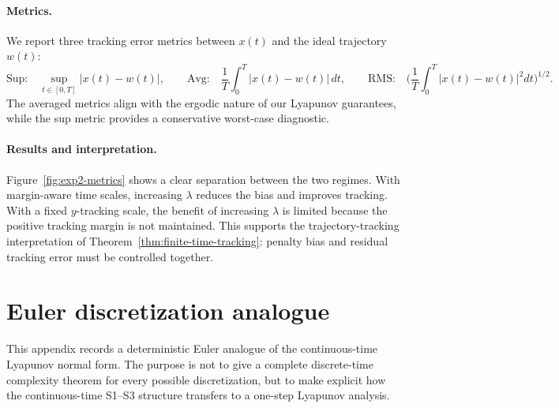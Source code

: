 \documentclass{article}
\newcommand{\1}{\mathbf{1}}
\begin{document}
\paragraph{Metrics.}
We report three tracking error metrics between $x(t)$ and the ideal trajectory $w(t)$:
\[
\text{Sup:}\quad \sup_{t\in[0,T]}|x(t)-w(t)|,
\qquad
\text{Avg:}\quad \frac1T\int_0^T|x(t)-w(t)|\,dt,
\qquad
\text{RMS:}\quad \Big(\frac1T\int_0^T|x(t)-w(t)|^2dt\Big)^{1/2}.
\]
The averaged metrics align with the ergodic nature of our Lyapunov guarantees, while the sup metric provides a conservative worst-case diagnostic.

\paragraph{Results and interpretation.}
Figure~\ref{fig:exp2-metrics} shows a clear separation between the two regimes.
With margin-aware time scales, increasing $\lambda$ reduces the bias and improves
tracking. With a fixed $y$-tracking scale, the benefit of increasing $\lambda$ is
limited because the positive tracking margin is not maintained. This supports
the trajectory-tracking interpretation of Theorem~\ref{thm:finite-time-tracking}:
penalty bias and residual tracking error must be controlled together.

\section{Euler discretization analogue}\label{app:euler-discretization}

This appendix records a deterministic Euler analogue of the continuous-time
Lyapunov normal form. The purpose is not to give a complete discrete-time
complexity theorem for every possible discretization, but to make explicit how
the continuous-time S1--S3 structure transfers to a one-step Lyapunov analysis.
\end{document}
